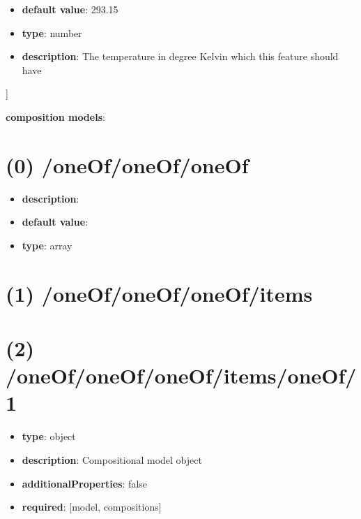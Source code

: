 \begin{itemize}[leftmargin=1em]\item {\bf default value}: 293.15
\item {\bf type}: number
\item {\bf description}: The temperature in degree Kelvin which this feature should have
\end{itemize}]\item {\bf composition models}: \section{(0) /oneOf/oneOf/oneOf}
\begin{itemize}[leftmargin=0em]\item {\bf description}: 
\item {\bf default value}: 
\item {\bf type}: array
\end{itemize}\section{(1) /oneOf/oneOf/oneOf/items}

\section{(2) /oneOf/oneOf/oneOf/items/oneOf/1}
\begin{itemize}[leftmargin=2em]\item {\bf type}: object
\item {\bf description}: Compositional model object
\item {\bf additionalProperties}: false
\item {\bf required}: [model, compositions]\end{itemize}
